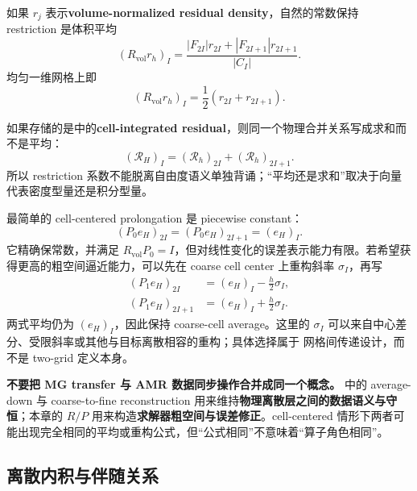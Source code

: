 如果 $r_j$ 表示\textbf{volume-normalized residual density}，自然的常数保持 restriction 是体积平均
\begin{equation}
(R_{\mathrm{vol}}r_h)_I
=\frac{|F_{2I}|r_{2I}+|F_{2I+1}|r_{2I+1}}{|C_I|}.
\label{eq:twogrid-cell-centered-volume-restriction}
\end{equation}
均匀一维网格上即
\begin{equation}
(R_{\mathrm{vol}}r_h)_I
=\frac12\left(r_{2I}+r_{2I+1}\right).
\end{equation}

如果存储的是中的\textbf{cell-integrated residual}，则同一个物理合并关系写成求和而不是平均：
\begin{equation}
(\mathcal R_H)_I
=(\mathcal R_h)_{2I}+(\mathcal R_h)_{2I+1}.
\label{eq:twogrid-cell-integrated-restriction}
\end{equation}
所以 restriction 系数不能脱离自由度语义单独背诵；“平均还是求和”取决于向量代表密度型量还是积分型量。

最简单的 cell-centered prolongation 是 piecewise constant：
\begin{equation}
(P_0e_H)_{2I}=(P_0e_H)_{2I+1}=(e_H)_I.
\label{eq:twogrid-cell-centered-p0}
\end{equation}
它精确保常数，并满足 $R_{\mathrm{vol}}P_0=I$，但对线性变化的误差表示能力有限。若希望获得更高的粗空间逼近能力，可以先在 coarse cell center 上重构斜率 $\sigma_I$，再写
\begin{align}
(P_1e_H)_{2I}
&=(e_H)_I-\frac h2\sigma_I,\\
(P_1e_H)_{2I+1}
&=(e_H)_I+\frac h2\sigma_I.
\label{eq:twogrid-cell-centered-linear-prolongation}
\end{align}
两式平均仍为 $(e_H)_I$，因此保持 coarse-cell average。这里的 $\sigma_I$ 可以来自中心差分、受限斜率或其他与目标离散相容的重构；具体选择属于 网格间传递设计，而不是 two-grid 定义本身。

\begin{warningbox}
\textbf{不要把 MG transfer 与 AMR 数据同步操作合并成同一个概念。}
中的 average-down 与 coarse-to-fine reconstruction 用来维持\textbf{物理离散层之间的数据语义与守恒}；本章的 $R/P$ 用来构造\textbf{求解器粗空间与误差修正}。cell-centered 情形下两者可能出现完全相同的平均或重构公式，但“公式相同”不意味着“算子角色相同”。
\end{warningbox}

\subsection{离散内积与伴随关系}

